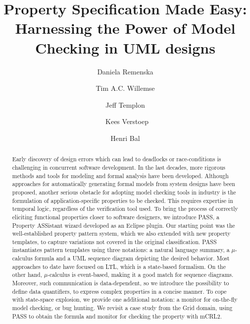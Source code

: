 \documentclass[letter]{llncs}
\begin{document}
\title{Property Specification Made Easy: Harnessing the Power of Model Checking in UML designs}

\author{Daniela Remenska
\and Tim A.C. Willemse \and Jeff Templon \and\
Kees Verstoep \and Henri Bal}
%


\maketitle

\begin{abstract}
Early discovery of design errors which can lead to deadlocks or race-conditions is 
challenging in concurrent software development. 
In the last decades, more rigorous
methods and tools for modeling and formal analysis have been developed. 
Although approaches for automatically generating formal models from system designs have 
been proposed, another serious obstacle for adopting model checking tools in industry
is the formulation of application-specific properties to be checked. 
This requires expertise in temporal logic, regardless of the verification tool used.
To bring the process of correctly eliciting functional properties closer to software 
designers, we introduce PASS, a Property ASSistant wizard developed 
as an Eclipse plugin. Our starting point was the well-established property pattern system,
which we also extended with new property templates, to capture variations not covered 
in the original classification. PASS instantiates pattern templates using three notations: a natural language summary, a $\mu$-calculus formula
and a UML sequence diagram depicting the desired behavior. Most approaches to date 
have focused on LTL, which is a state-based formalism. On the other hand,
 $\mu$-calculus is event-based, making it a good match for sequence diagrams. 
Moreover, such communication is data-dependent, so we introduce
the possibility to define data quantifiers, to express complex properties in a concise manner.
To cope with state-space explosion, we provide one additional notation: a monitor for on-the-fly model checking, or bug hunting.
We revisit a case study from the Grid domain, using PASS to obtain the
formula and monitor for checking the property with mCRL2.
\end{abstract}
\end{document}
